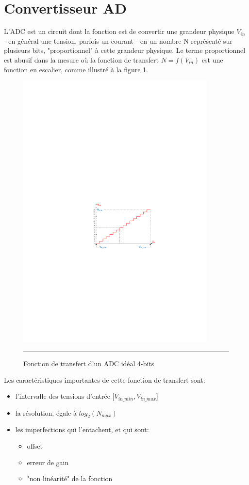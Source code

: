 \section{Convertisseur AD}
L'ADC est un circuit dont la fonction est de convertir une grandeur physique $V_{in}$ - en général une tension, parfois un courant - en un nombre N représenté sur plusieurs bits, "proportionnel" à cette grandeur physique.
Le terme proportionnel est abusif dans la mesure où la fonction de transfert $N = f(V_{in})$ est une fonction en escalier, comme illustré à la figure \ref{fig:ADC_Fonction}.

\begin{figure}[htb]
  \centering
  \includegraphics [angle=0, width=10cm]{./Figures/Chap11_ADC/ADC_Fonction.pdf}
  \rule{35em}{0.5pt}
  \caption{Fonction de transfert d'un ADC idéal 4-bits}
  \label{fig:ADC_Fonction}
\end{figure}

Les caractéristiques importantes de cette fonction de transfert sont:
\begin{itemize}[label=\textbullet,font=\small]
  \item l'intervalle des tensions d'entrée $[V_{in\_min}, V_{in\_max}$]
  \item la résolution, égale à $log_{2}(N_{max})$
  \item les imperfections qui l'entachent, et qui sont:
  \begin{itemize}[label=\textbullet,font=\small]
    \item offset
    \item erreur de gain
    \item "non linéarité" de la fonction
  \end{itemize}
\end{itemize}

